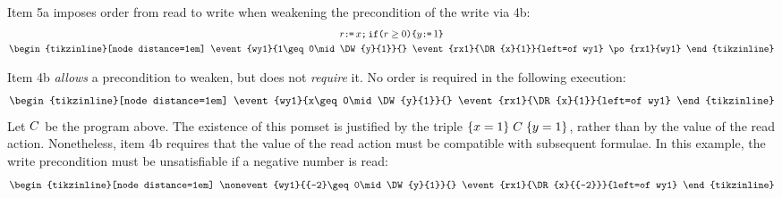 Item 5a imposes order from read to write when weakening the
precondition of the write via 4b:
\begin{gather*}
  r\GETS x\SEMI\IF{r\geq0}\THEN y\GETS1 \FI
  \\
  \hbox{\begin{tikzinline}[node distance=1em]
      \event{wy1}{1\geq0\mid\DW{y}{1}}{}
      \event{rx1}{\DR{x}{1}}{left=of wy1}
      \po{rx1}{wy1}
    \end{tikzinline}}
\end{gather*}


Item 4b \emph{allows} a precondition to weaken, but does not \emph{require} it.
No order is required in the following execution:
\begin{gather*}
  \hbox{\begin{tikzinline}[node distance=1em]
      \event{wy1}{x\geq0\mid\DW{y}{1}}{}
      \event{rx1}{\DR{x}{1}}{left=of wy1}
    \end{tikzinline}}
\end{gather*}
Let $C$ be the program above.  The existence of this pomset is justified
by the triple $\{x=1\}\allowbreak\;C\;\allowbreak\{y=1\}$, rather than by the value of the read
action.  Nonetheless, item 4b requires that the value of the read action must
be compatible with subsequent formulae.  In this example, the write
precondition must be unsatisfiable if a negative number is read:
\begin{gather*}
  \hbox{\begin{tikzinline}[node distance=1em]
      \nonevent{wy1}{{-2}\geq0\mid\DW{y}{1}}{}
      \event{rx1}{\DR{x}{{-2}}}{left=of wy1}
    \end{tikzinline}}
\end{gather*}


